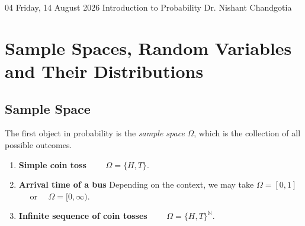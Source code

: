 
\lecture
{04}
{Friday, 14 August 2026}
{Introduction to Probability}
{Dr. Nishant Chandgotia}

\section{Sample Spaces, Random Variables and Their Distributions}

\subsection{Sample Space}

The first object in probability is the \emph{sample space} $\Omega$,
which is the collection of all possible outcomes.

\begin{enumerate}

    \item \textbf{Simple coin toss}
    \(
    \qquad
    \Omega=\{H,T\}.
    \)

    \item \textbf{Arrival time of a bus}
    Depending on the context, we may take
    \(
    \Omega=[0,1]
    \)~~ 
    or~~
    \(
    \Omega=[0,\infty).
    \)

    \item \textbf{Infinite sequence of coin tosses}
    \(\qquad
    \Omega=\{H,T\}^{\mathbb{N}}.
    \)

\end{enumerate}

